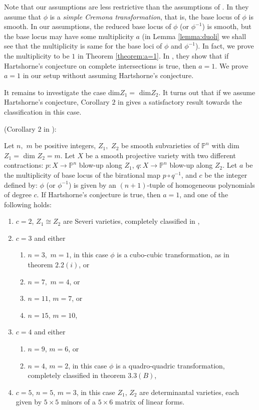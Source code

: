 \documentclass{article}
\newenvironment{manualtheorem}[1]{%
  \renewcommand\themanualtheoreminner{#1}%
  \manualtheoreminner
}{\endmanualtheoreminner}
\begin{document}
Note that our assumptions are less restrictive than the assumptions of \cite{ein1989some}. In \cite{ein1989some} they assume that $\phi$ is a \textit{simple Cremona transformation}, that is, the base locus of $\phi$ is smooth. In our assumptions, the reduced base locus of $\phi$ (or $\phi^{-1}$) is smooth, but the base locus may have some multiplicity $a$ (in Lemma \ref{lemma:duoli} we shall see that the multiplicity is same for the base loci of $\phi$ and $\phi^{-1}$). In fact, we prove the multiplicity to be $1$ in Theorem \ref{theorem:a=1}. In \cite{crauder1991cremona}, they show that if Hartshorne's conjecture on complete intersections is true, then $a=1$. We prove $a=1$ in our setup without assuming Hartshorne's conjecture.

It remains to investigate the case dim$Z_1=$ dim$Z_2$. It turns out that if we assume Hartshorne's conjecture, Corollary $2$ in \cite{crauder1991cremona} gives a satisfactory result towards the classification in this case.

\begin{manualtheorem}{B}
    
 (Corollary $2$ in \cite{crauder1991cremona}):

Let $n,$ $m$ be positive integers, $Z_1,$ $Z_2$ be smooth subvarieties of $\mathbb{P}^n$ with dim $Z_1=$ dim $Z_2=m$. Let $X$ be a smooth projective variety with two different contractions: $p:X\to \mathbb{P}^n $ blow-up along $Z_1$, $q:X\to \mathbb{P}^n $ blow-up along $Z_2$. Let $a$ be the multiplicity of base locus of the birational map $p\circ q^{-1}$, and $c$ be the integer defined by: $\phi$ (or $\phi^{-1}$) is given by an $(n+1)$-tuple of homogeneous polynomials of degree $c$. If Hartshorne's conjecture is true, then $a=1$, and one of the following holds:
\begin{enumerate}
    \item $c=2$, $Z_1\cong Z_2$ are Severi varieties, completely classified in \cite{zak1984varieties},
    \item $c=3$ and either \begin{enumerate}
        \item[(a)] $n=3,$ $m=1$, in this case $\phi$ is a cubo-cubic transformation, as in \cite{crauder1989cremona} theorem $2.2(i)$, or
        \item [(b)] $n=7,$ $ m=4$, or
        \item [(c)] $n=11$, $m=7$, or
        \item [(d)] $n=15$, $m=10$,
    \end{enumerate}
    \item $c=4$ and either \begin{enumerate}
        \item [(a)] $n=9$, $m=6$, or 
        \item [(b)] $n=4$, $m=2$, in this case $\phi$ is a quadro-quadric transformation, completely classified in \cite{crauder1989cremona} theorem $3.3(B)$,
    \end{enumerate}
    \item $c=5$, $n=5$, $m=3$, in this case $Z_1$, $Z_2$ are determinantal varieties, each given by $5\times 5$ minors of a $5\times 6$ matrix of linear forms.
\end{enumerate}
\end{manualtheorem}
\end{document}
